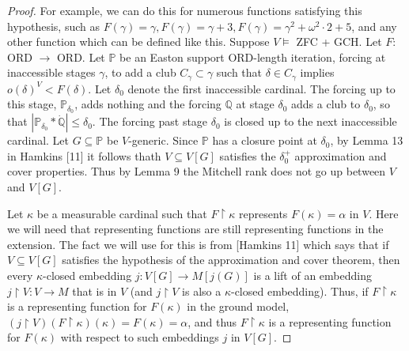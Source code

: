\documentclass[10pt,leqno]{amsart}
\begin{document}
\begin{proof} For example, we can do this for numerous functions satisfying this hypothesis, such as $F(\gamma) = \gamma, F(\gamma) = \gamma + 3, F(\gamma) = \gamma^2 + \omega^2 \cdot 2 + 5$, and any other function which can be defined like this. Suppose $V \models$ ZFC + GCH. Let $F:$ ORD $\to$ ORD. Let $\mathbb{P}$ be an Easton support ORD-length iteration, forcing at inaccessible stages $\gamma$, to add a club $C_{\gamma} \subset \gamma$ such that $\delta \in C_{\gamma}$ implies $o(\delta)^V < F(\delta)$. Let $\delta_0$ denote the first inaccessible cardinal. The forcing up to this stage, $\mathbb{P}_{\delta_0}$, adds nothing and the forcing $\mathbb{Q}$ at stage $\delta_0$ adds a club to $\delta_0$, so that $|\mathbb{P}_{\delta_0}*\dot{\mathbb{Q}}| \le \delta_0$. The forcing past stage $\delta_0$ is closed up to the next inaccessible cardinal. Let $G \subseteq \mathbb{P}$ be $V$-generic. Since $\mathbb{P}$ has a closure point at $\delta_0$, by Lemma 13 in Hamkins [11] it follows thath $V \subseteq V[G]$ satisfies the $\delta_0^+$ approximation and cover properties. Thus by Lemma 9 the Mitchell rank does not go up between $V$ and $V[G]$.

Let $\kappa$ be a measurable cardinal such that $F \upharpoonright \kappa$ represents $F(\kappa) = \alpha$ in $V$. Here we will need that representing functions are still representing functions in the extension. The fact we will use for this is from [Hamkins 11] which says that if $V \subseteq V[G]$ satisfies the hypothesis of the approximation and cover theorem, then every $\kappa$-closed embedding $j:V[G] \to M[j(G)]$ is a lift of an embedding $j \upharpoonright V: V \to M$ that is in $V$ (and $j \upharpoonright V$ is also a $\kappa$-closed embedding).
Thus, if $F \upharpoonright \kappa$ is a representing function for $F(\kappa)$ in the ground model, $(j \upharpoonright V)(F \upharpoonright \kappa)(\kappa) = F(\kappa) = \alpha$, and thus $F \upharpoonright \kappa$ is a representing function for $F(\kappa)$ with respect to such embeddings $j$ in $V[G]$.


\end{proof}
\end{document}
